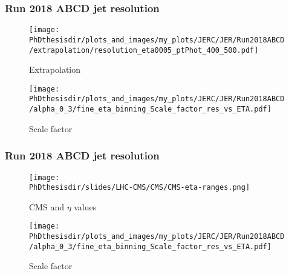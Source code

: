 \begin{frame}
\frametitle{Run 2018 ABCD jet resolution}
\begin{minipage}{.45\textwidth}
\begin{figure}
\texttt{[image: \\PhDthesisdir/plots\_and\_images/my\_plots/JERC/JER/Run2018ABCD/extrapolation/resolution\_eta0005\_ptPhot\_400\_500.pdf]}
\caption{Extrapolation}
\end{figure}
\end{minipage}
\hfill
\begin{minipage}{.45\textwidth}
\begin{figure}
\texttt{[image: \\PhDthesisdir/plots\_and\_images/my\_plots/JERC/JER/Run2018ABCD/alpha\_0\_3/fine\_eta\_binning\_Scale\_factor\_res\_vs\_ETA.pdf]}
\caption{Scale factor}
\end{figure}
\end{minipage}
\end{frame}

\begin{frame}\addtocounter{framenumber}{-1}
\frametitle{Run 2018 ABCD jet resolution}
\begin{minipage}{.45\textwidth}
\begin{figure}
\texttt{[image: \\PhDthesisdir/slides/LHC-CMS/CMS/CMS-eta-ranges.png]}
\caption{CMS and $\eta$ values}
\end{figure}
\end{minipage}
\hfill
\begin{minipage}{.45\textwidth}
\begin{figure}
\texttt{[image: \\PhDthesisdir/plots\_and\_images/my\_plots/JERC/JER/Run2018ABCD/alpha\_0\_3/fine\_eta\_binning\_Scale\_factor\_res\_vs\_ETA.pdf]}
\caption{Scale factor}
\end{figure}
\end{minipage}
\end{frame}
